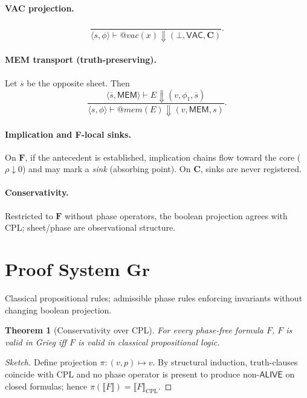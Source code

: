 \documentclass[11pt]{article}
\newtheorem{theorem}{Theorem}
\begin{document}
\paragraph{VAC projection.}
\[
\frac{}{ \langle s,\phi \rangle \vdash @\!vac(x) \Downarrow (\bot,\mathsf{VAC},\mathbf{C}) }.
\]

\paragraph{MEM transport (truth-preserving).}
Let $\overline{s}$ be the opposite sheet. Then
\[
\frac{ \langle \overline{s},\mathsf{MEM} \rangle \vdash E \Downarrow (v,\phi_1,\overline{s}) }
     { \langle s,\phi \rangle \vdash @\!mem(E) \Downarrow (v,\mathsf{MEM},s) }.
\]

\paragraph{Implication and F-local sinks.}
On $\mathbf{F}$, if the antecedent is established, implication chains flow toward the core ($\rho \downarrow 0$) and may mark a \emph{sink} (absorbing point).
On $\mathbf{C}$, sinks are never registered.

\paragraph{Conservativity.}
Restricted to $\mathbf{F}$ without phase operators, the boolean projection agrees with CPL; sheet/phase are observational structure.

\section{Proof System $\mathbf{G\!r}$}
Classical propositional rules; admissible phase rules enforcing invariants without changing boolean projection.

\begin{theorem}[Conservativity over CPL]
For every phase-free formula $F$, $F$ is valid in Grieg iff $F$ is valid in classical propositional logic.
\end{theorem}
\begin{proof}[Sketch]
Define projection $\pi:(v,p)\mapsto v$. By structural induction, truth-clauses coincide with CPL and no phase operator is present to produce non-$\mathsf{ALIVE}$ on closed formulas; hence $\pi(\llbracket F\rrbracket)=\llbracket F\rrbracket_{\mathrm{CPL}}$.
\end{proof}
\end{document}
